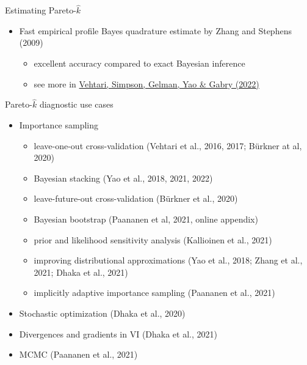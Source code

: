 \documentclass[finnish,english,t]{beamer}
\begin{document}
\begin{frame}{Estimating Pareto-$\hat{k}$}

  \begin{itemize}
  \item Fast empirical profile Bayes quadrature estimate by Zhang and
    Stephens (2009)
    \begin{itemize}
    \item excellent accuracy compared to exact Bayesian inference
    \item see more in \href{https://arxiv.org/abs/1507.02646}{Vehtari, Simpson, Gelman, Yao \& Gabry (2022)}
    \end{itemize}
  \end{itemize}

\end{frame}

\begin{frame}{Pareto-$\hat{k}$ diagnostic use cases}

  \vspace{-.5\baselineskip}
  \begin{itemize}
  \item Importance sampling
    \begin{itemize}
    \item leave-one-out cross-validation (Vehtari et al., 2016, 2017; Bürkner at al, 2020)
    \item Bayesian stacking (Yao et al., 2018, 2021, 2022)
    \item leave-future-out cross-validation (Bürkner et al., 2020)
    \item Bayesian bootstrap (Paananen et al, 2021, online appendix)
    \item prior and likelihood sensitivity analysis (Kallioinen et al., 2021)
    \item improving distributional approximations (Yao et al., 2018; Zhang et al., 2021; Dhaka et al., 2021)
    \item implicitly adaptive importance sampling (Paananen et al., 2021)
    \end{itemize}
  \item Stochastic optimization (Dhaka et al., 2020)
  \item Divergences and gradients in VI (Dhaka et al., 2021)
  \item MCMC (Paananen et al., 2021)
  \end{itemize}

\end{frame}
\end{document}
